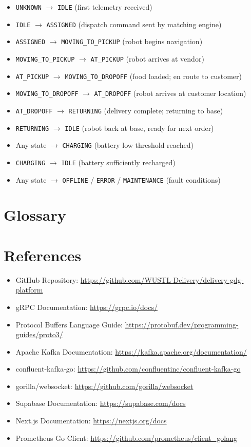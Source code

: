 \documentclass[12pt,a4paper]{article}
\begin{document}
\begin{itemize}
  \item \texttt{UNKNOWN} $\rightarrow$ \texttt{IDLE} (first telemetry received)
  \item \texttt{IDLE} $\rightarrow$ \texttt{ASSIGNED} (dispatch command sent by matching engine)
  \item \texttt{ASSIGNED} $\rightarrow$ \texttt{MOVING\_TO\_PICKUP} (robot begins navigation)
  \item \texttt{MOVING\_TO\_PICKUP} $\rightarrow$ \texttt{AT\_PICKUP} (robot arrives at vendor)
  \item \texttt{AT\_PICKUP} $\rightarrow$ \texttt{MOVING\_TO\_DROPOFF} (food loaded; en route to customer)
  \item \texttt{MOVING\_TO\_DROPOFF} $\rightarrow$ \texttt{AT\_DROPOFF} (robot arrives at customer location)
  \item \texttt{AT\_DROPOFF} $\rightarrow$ \texttt{RETURNING} (delivery complete; returning to base)
  \item \texttt{RETURNING} $\rightarrow$ \texttt{IDLE} (robot back at base, ready for next order)
  \item Any state $\rightarrow$ \texttt{CHARGING} (battery low threshold reached)
  \item \texttt{CHARGING} $\rightarrow$ \texttt{IDLE} (battery sufficiently recharged)
  \item Any state $\rightarrow$ \texttt{OFFLINE} / \texttt{ERROR} / \texttt{MAINTENANCE} (fault conditions)
\end{itemize}

\newpage
\section{Glossary}

\newpage
\section{References}
\begin{itemize}
  \item GitHub Repository: \url{https://github.com/WUSTL-Delivery/delivery-gdg-platform}
  \item gRPC Documentation: \url{https://grpc.io/docs/}
  \item Protocol Buffers Language Guide: \url{https://protobuf.dev/programming-guides/proto3/}
  \item Apache Kafka Documentation: \url{https://kafka.apache.org/documentation/}
  \item confluent-kafka-go: \url{https://github.com/confluentinc/confluent-kafka-go}
  \item gorilla/websocket: \url{https://github.com/gorilla/websocket}
  \item Supabase Documentation: \url{https://supabase.com/docs}
  \item Next.js Documentation: \url{https://nextjs.org/docs}
  \item Prometheus Go Client: \url{https://github.com/prometheus/client_golang}
\end{itemize}
\end{document}
